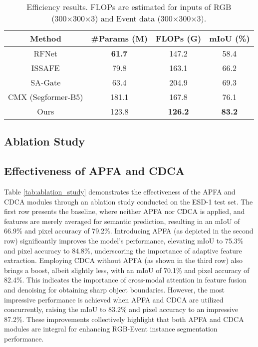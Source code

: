 \documentclass[lettersize,journal]{IEEEtran}
\begin{document}
\begin{table}[ht]
\centering
\caption{Efficiency results. FLOPs are estimated for inputs of
RGB (300×300×3) and Event data (300×300×3).}
\begin{tabular}{|c|c|c|c|}
\hline
\textbf{Method} & \textbf{\#Params (M)} & \textbf{FLOPs (G)} & \textbf{mIoU (\%)} \\
\hline
RFNet\cite{Sun2020Real-TimeDetection}  & \textbf{61.7}   & 147.2   & 58.4 \\
\hline
ISSAFE\cite{Zhang2020ISSAFE:Data} & 79.8   &  163.1  & 66.2   \\
\hline
SA-Gate\cite{Xiaokang2020Bi-directionalSegmentation} & 63.4 & 204.9 & 69.3 \\
\hline
CMX (Segformer-B5) & 181.1 & 167.8 & 76.1 \\
\hline
Ours &  123.8   & \textbf{126.2}    &  \textbf{83.2}   \\
\hline
\end{tabular}

\label{tab:Efficiency Results}
\end{table}










\subsection{Ablation Study}
\subsection{Effectiveness of APFA and CDCA}
Table \ref{tab:ablation_study} demonstrates the effectiveness of the APFA and CDCA modules through an ablation study conducted on the ESD-1 test set. The first row presents the baseline, where neither APFA nor CDCA is applied, and features are merely averaged for semantic prediction, resulting in an mIoU of 66.9\% and pixel accuracy of 79.2\%. Introducing APFA (as depicted in the second row) significantly improves the model's performance, elevating mIoU to 75.3\% and pixel accuracy to 84.8\%, underscoring the importance of adaptive feature extraction. Employing CDCA without APFA (as shown in the third row) also brings a boost, albeit slightly less, with an mIoU of 70.1\% and pixel accuracy of 82.4\%. This indicates the importance of cross-modal attention in feature fusion and denoising for obtaining sharp object boundaries. However, the most impressive performance is achieved when APFA and CDCA are utilized concurrently, raising the mIoU to 83.2\% and pixel accuracy to an impressive 87.2\%. These improvements collectively highlight that both APFA and CDCA modules are integral for enhancing RGB-Event instance segmentation performance.
\end{document}
